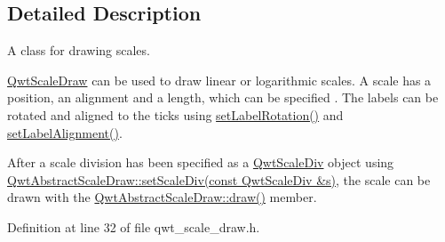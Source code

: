 \subsection{Detailed Description}
A class for drawing scales. 

\hyperlink{class_qwt_scale_draw}{Qwt\-Scale\-Draw} can be used to draw linear or logarithmic scales. A scale has a position, an alignment and a length, which can be specified . The labels can be rotated and aligned to the ticks using \hyperlink{class_qwt_scale_draw_abf5881339fddde65a00c1dd391023320}{set\-Label\-Rotation()} and \hyperlink{class_qwt_scale_draw_a3df0a1fe4a498ef028a5348e54bfaa7f}{set\-Label\-Alignment()}.

After a scale division has been specified as a \hyperlink{class_qwt_scale_div}{Qwt\-Scale\-Div} object using \hyperlink{class_qwt_abstract_scale_draw_a4399aac94a294f5ed6c52114dde00d2f}{Qwt\-Abstract\-Scale\-Draw\-::set\-Scale\-Div(const Qwt\-Scale\-Div \&s)}, the scale can be drawn with the \hyperlink{class_qwt_abstract_scale_draw_aca3c3a7499112f52616d0ee8518fa5a6}{Qwt\-Abstract\-Scale\-Draw\-::draw()} member. 

Definition at line 32 of file qwt\-\_\-scale\-\_\-draw.\-h.



